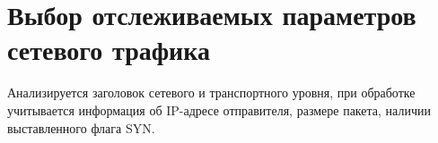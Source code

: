 \documentclass{bmstu}
\begin{document}







\section{Выбор отслеживаемых параметров сетевого трафика}

Анализируется заголовок сетевого и транспортного уровня, при обработке учитывается информация об IP-адресе отправителя, размере пакета, наличии выставленного флага SYN.
\end{document}
